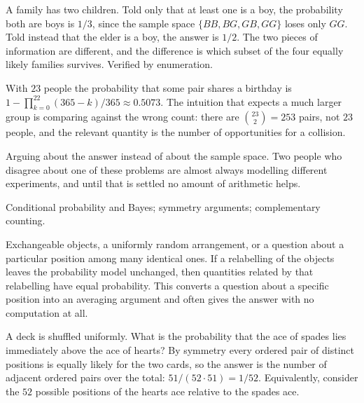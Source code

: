 \begin{worked}
A family has two children. Told only that at least one is a boy, the probability both are boys is $1/3$, since the sample space $\{BB,BG,GB,GG\}$ loses only $GG$. Told instead that the elder is a boy, the answer is $1/2$. The two pieces of information are different, and the difference is which subset of the four equally likely families survives. Verified by enumeration.
\end{worked}

\begin{worked}
With $23$ people the probability that some pair shares a birthday is $1-\prod_{k=0}^{22}(365-k)/365\approx0.5073$. The intuition that expects a much larger group is comparing against the wrong count: there are $\binom{23}{2}=253$ pairs, not $23$ people, and the relevant quantity is the number of opportunities for a collision.
\end{worked}

\begin{trap}
Arguing about the answer instead of about the sample space. Two people who disagree about one of these problems are almost always modelling different experiments, and until that is settled no amount of arithmetic helps.
\end{trap}

\begin{seealsob}Conditional probability and Bayes; symmetry arguments; complementary counting.\end{seealsob}

\cue Exchangeable objects, a uniformly random arrangement, or a question about a particular position among many identical ones.
\method If a relabelling of the objects leaves the probability model unchanged, then quantities related by that relabelling have equal probability. This converts a question about a specific position into an averaging argument and often gives the answer with no computation at all.

\begin{worked}
A deck is shuffled uniformly. What is the probability that the ace of spades lies immediately above the ace of hearts? By symmetry every ordered pair of distinct positions is equally likely for the two cards, so the answer is the number of adjacent ordered pairs over the total: $51/(52\cdot51)=1/52$. Equivalently, consider the $52$ possible positions of the hearts ace relative to the spades ace.
\end{worked}

